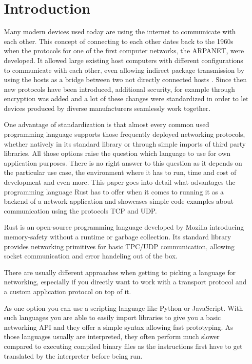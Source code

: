 
\section{Introduction}
Many modern devices used today are using the internet to communicate with each other. This concept of connecting to
each other dates back to the 1960s when the protocols for one of the first computer networks, the ARPANET, were
developed. It allowed large existing host computers with different configurations to communicate with each other, even
allowing indirect package transmission by using the hosts as a bridge between two not directly connected hosts
\cite{f70arpa}. Since then new protocols have been introduced, additional security, for example through encryption was
added and a lot of these changes were standardized in order to let devices produced by diverse manufacturers seamlessly
work together.

One advantage of standardization is that almost every common used programming language supports those frequently
deployed networking protocols, whether natively in its standard library or through simple imports of third party
libraries. All those options raise the question which language to use for own application purposes. There is no right
answer to this question as it depends on the particular use case, the environment where it has to run, time and cost of
development and even more. This paper goes into detail what advantages the programming language Rust has to offer when
it comes to running it as a backend of a network application and showcases simple code examples about communication
using the protocols TCP and UDP.

Rust is an open-source programming language developed by Mozilla introducing memory-safety without a runtime or garbage
collection. Its standard library provides networking primitives for basic TPC/UDP communication, allowing socket
communication and error handeling out of the box. \cite{rust-language}

There are usually different approaches when getting to picking a language for networking, especially if you directly
want to work with a transport protocol and a custom application protocol on top of it.

As one option you can use a scripting language like Python or JavaScript. With such languages you are able to easily
import libraries to give you a basic networking API and they offer a simple syntax allowing fast prototyping. As those
languages usually are interpreted, they often perform much slower compared to executing compiled binary files as the
instructions first have to get translated by the interpreter before being run.

